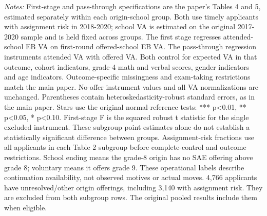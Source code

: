\begin{table}[!htbp]
\begin{minipage}{\textwidth}
\textit{Notes:} First-stage and pass-through specifications are the paper's Tables 4 and 5, estimated separately within each origin-school group. Both use timely applicants with assignment risk in 2018-2020; school VA is estimated on the original 2017-2020 sample and is held fixed across groups. The first stage regresses attended-school EB VA on first-round offered-school EB VA. The pass-through regression instruments attended VA with offered VA. Both control for expected VA in that outcome, cohort indicators, grade-4 math and verbal scores, gender indicators and age indicators. Outcome-specific missingness and exam-taking restrictions match the main paper. No-offer instrument values and all VA normalizations are unchanged. Parentheses contain heteroskedasticity-robust standard errors, as in the main paper. Stars use the original normal-reference tests: *** p<0.01, ** p<0.05, * p<0.10. First-stage F is the squared robust t statistic for the single excluded instrument. These subgroup point estimates alone do not establish a statistically significant difference between groups. Assignment-risk fractions use all applicants in each Table 2 subgroup before complete-control and outcome restrictions. School ending means the grade-8 origin has no SAE offering above grade 8; voluntary means it offers grade 9. These operational labels describe continuation availability, not observed motives or actual moves. 4,766 applicants have unresolved/other origin offerings, including 3,140 with assignment risk. They are excluded from both subgroup rows. The original pooled results include them when eligible.
\end{minipage}
\end{table}
